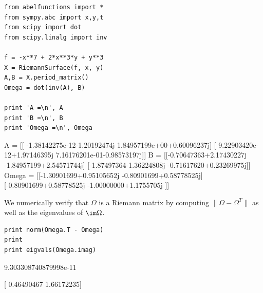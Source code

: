 \begin{lstlisting}
from abelfunctions import *
from sympy.abc import x,y,t
from scipy import dot
from scipy.linalg import inv

f = -x**7 + 2*x**3*y + y**3
X = RiemannSurface(f, x, y)
A,B = X.period_matrix()
Omega = dot(inv(A), B)

print 'A =\n', A
print 'B =\n', B
print 'Omega =\n', Omega
\end{lstlisting}
\begin{pyoutput}
A =
[[ -1.38142275e-12-1.20192474j   1.84957199e+00+0.60096237j]
 [  9.22903420e-12+1.97146395j   7.16176201e-01-0.98573197j]]
B =
[[-0.70647363+2.17430227j -1.84957199+2.54571744j]
 [-1.87497364-1.36224808j -0.71617620+0.23269975j]]
Omega =
[[-1.30901699+0.95105652j -0.80901699+0.58778525j]
 [-0.80901699+0.58778525j -1.00000000+1.1755705j ]]
\end{pyoutput}
We numerically verify that $\Omega$ is a Riemann matrix by computing
$\|\Omega - \Omega^T\|$ as well as the eigenvalues of $\im \Omega$.
\begin{lstlisting}[firstnumber=14]
print norm(Omega.T - Omega)
print
print eigvals(Omega.imag)
\end{lstlisting}
\begin{pyoutput}
9.303308740879998e-11

[ 0.46490467  1.66172235]
\end{pyoutput}




